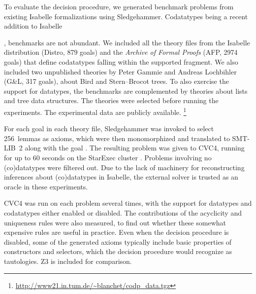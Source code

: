 \newcommand\gandl{G\&L}
\newcommand\HD[1]{\hbox to2.25em{\footnotesize\hfill\!\!\!\!#1\!\!\!\!\hfill}}

To evaluate the decision procedure, we generated benchmark problems from existing
Isabelle formalizations using Sledgehammer.
Codatatypes being a recent addition to Isabelle\begin{rep}
\cite{blanchette-et-al-2014-impl}\end{rep}, benchmarks are not abundant. We
included all the theory files from the Isabelle distribution (Distro, 879 goals)
and the \emph{Archive of Formal Proofs} (AFP, 2974 goals) \cite{klein-et-al-afp}
that define codatatypes falling within the supported fragment. We also included
two unpublished theories by Peter Gammie and Andreas Lochbihler (\gandl, 317
goals), about Bird and Stern--Brocot trees. To also exercise the support
for datatypes, the benchmarks are complemented by theories about lists
and tree data structures. The theories were selected before running the
experiments. The experimental data are publicly available.%
\footnote{\url{http://www21.in.tum.de/~blanchet/codp_data.tgz}}


For each goal in each theory file, Sledgehammer was invoked to select
256~lemmas as axioms, which were then monomorphized and translated to SMT-LIB~2
along with the goal \cite{blanchette-et-al-2013-smt}. The resulting problem was
given to CVC4, running for up to 60 seconds on the StarExec cluster
\cite{stump-et-al-2014-starexec}. Problems involving no (co)datatypes were
filtered out. Due to the lack of machinery for reconstructing inferences about
(co)datatypes in Isabelle, the external solver is trusted as an oracle in these
experiments.

CVC4 was run on each problem several times, with the support for datatypes and
codatatypes either enabled or disabled. The contributions of the acyclicity and
uniqueness rules were also measured, to find out whether these somewhat
expensive rules are useful in practice. Even when the decision procedure is
disabled, some of the generated axioms typically include basic properties of
constructors and selectors, which the decision procedure would recognize as
tautologies. Z3 is included for comparison. %


